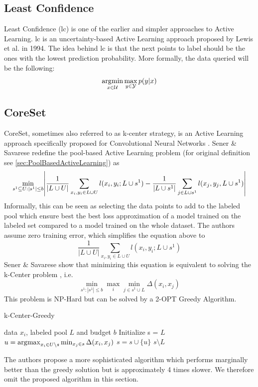 \subsection{Least Confidence}
\label{sec:Related_work:Active_Learning:Least_Confidence}
Least Confidence (\gls{lc}) is one of the earlier and simpler approaches to Active Learning. \gls{lc} is an uncertainty-based Active Learning
approach proposed by Lewis et al. \cite{lewis1995sequential} in 1994. The idea behind \gls{lc} is that the next points to label should be the 
ones with the lowest prediction probability. More formally, the data queried will be the following:
\begin{equation}
    \operatorname*{\arg\!\min}_{x \in \mathcal{U}} \max_{y \in \mathcal{Y}} p(y|x)
\end{equation}

\subsection{CoreSet}
\label{sec:Related_work:Active_Learning:CoreSet}
CoreSet, sometimes also referred to as k-center strategy, is an Active Learning approach specifically proposed for Convolutional Neural
Networks \cite{sener2017active}. Sener \& Savarese redefine the pool-based Active Learning problem (for original definition see 
\ref{sec:PoolBasedActiveLearning}) as 
\begin{equation}
    \min_{s^1 \subseteq U: |s^1| \leq b } \abs{\frac{1}{|L \cup U|} \sum_{x_i,y_i \in L \cup U} l(x_i,y_i;L \cup s^1) - \frac{1}{|L \cup s^1|} 
    \sum_{j \in L \cup s^1} l(x_j,y_j,L \cup s^1)} 
\end{equation}
Informally, this can be seen as selecting the data points to add to the labeled pool which ensure best the best loss approximation
of a model trained on the labeled set compared to a model trained on the whole dataset. The authors assume zero training error, which
simplifies the equation above to
\begin{equation}
    \frac{1}{|L \cup U|} \sum_{x_i,y_i \in L \cup U} l(x_i,y_i;L \cup s^1)
\end{equation}
Sener \& Savarese show that minimizing this equation is equivalent to solving the k-Center problem \cite{wolf2011facility}, i.e.
\begin{equation}
    \min_{s^1: |s^1| \leq b} \max_i \min_{j \in s^1 \cup L}  \Delta (x_i,x_j)
\end{equation}
This problem is NP-Hard but can be solved by a 2-OPT Greedy Algorithm.
\begin{algorithm}
    \caption{k-Center-Greedy} \label{alg:kCenterGreedy}
    \begin{algorithmic}
        \Require data $x_i$, labeled pool $L$ and budget $b$
        \State Initialize s = $L$
        \Repeat
        \State $u = \operatorname*{\arg\!\max}_{x_i \in U \setminus s} \min_{x_j \in s} \Delta(x_i,x_j)$
        \State $s = s \cup \{u\}$
        \return $s \setminus L$
    \end{algorithmic}
\end{algorithm}
The authors propose a more sophisticated algorithm which performs marginally better than the greedy solution but is approximately 
4 times slower. We therefore omit the proposed algorithm in this section.

